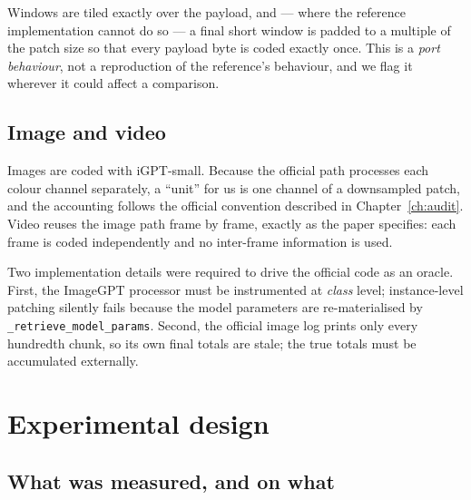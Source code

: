 \documentclass[11pt,a4paper]{article}
\newcommand{\code}[1]{\texttt{\small #1}}
\begin{document}
Windows are tiled exactly over the payload, and --- where the reference
implementation cannot do so --- a final short window is padded to a multiple of
the patch size so that every payload byte is coded exactly once. This is a
\emph{port behaviour}, not a reproduction of the reference's behaviour, and we
flag it wherever it could affect a comparison.

\subsection{Image and video}

Images are coded with iGPT-small. Because the official path processes each colour
channel separately, a ``unit'' for us is one channel of a downsampled patch, and
the accounting follows the official convention described in
Chapter~\ref{ch:audit}. Video reuses the image path frame by frame, exactly as
the paper specifies: each frame is coded independently and no inter-frame
information is used.

Two implementation details were required to drive the official code as an
oracle. First, the ImageGPT processor must be instrumented at \emph{class} level;
instance-level patching silently fails because the model parameters are
re-materialised by \code{\_retrieve\_model\_params}. Second, the official image
log prints only every hundredth chunk, so its own final totals are stale; the
true totals must be accumulated externally.

\section{Experimental design}

\subsection{What was measured, and on what}
\end{document}
